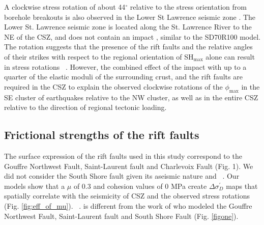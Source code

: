 \documentclass[draft]{agujournal2018}
\begin{document}
A clockwise stress rotation of about 44$^\circ$ relative to the stress orientation from borehole breakouts is also observed in the Lower St Lawrence seismic zone \citep{Mazzotti_2010}. The Lower St. Lawrence seismic zone is located along the St. Lawrence River to the NE of the CSZ, and does not contain an impact , similar to the SD70R100 model. The rotation suggests that the presence of the rift faults and the relative angles of their strikes with respect to the regional orientation of SH$_{\max}$ alone can result in stress rotations ~\citep[e.g.,][]{Zoback_1992}. However, the combined effect of the impact  with up to a quarter of the elastic moduli of the surrounding crust, and the rift faults are required in the CSZ to explain the observed clockwise rotations of the $\phi_{\max}$ in the SE cluster of earthquakes relative to the NW cluster, as well as in the entire CSZ relative to the direction of regional tectonic loading.


\subsection{Frictional strengths of the rift faults}
The surface expression of the rift faults used in this study correspond to the Gouffre Northwest Fault, Saint-Laurent fault and Charlevoix Fault (Fig. 1). We did not consider the South Shore fault given its aseismic nature and ~\citep{lamontagne1999}. Our models show that a $\mu$ of 0.3 and cohesion values of 0 MPa create $\Delta\sigma_{D}^\prime$ maps that spatially correlate with the seismicity of CSZ and the observed stress rotations (Fig. \ref{fig:eff_of_mu}).  ~\citep[e.g.,][]{Stevens1980}.  is different from the work of \citet{Baird_2010} who modeled the Gouffre Northwest Fault, Saint-Laurent fault and South Shore Fault (Fig. \ref{figone}). 
\end{document}
